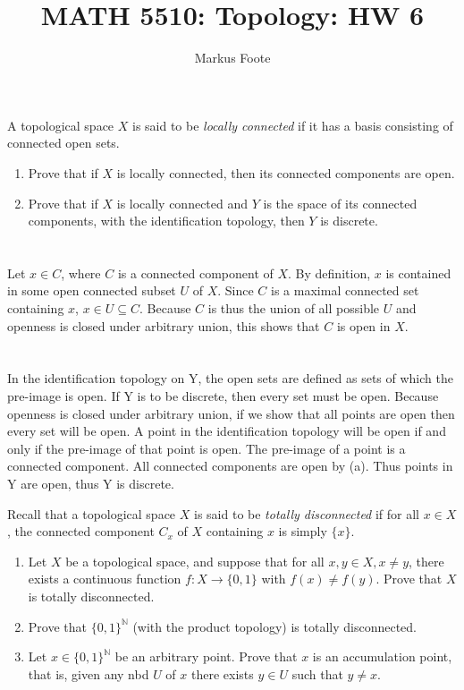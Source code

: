 \documentclass{jhwhw}
\title{MATH 5510: Topology: HW 6}
\author{Markus Foote}
\newcommand{\N}{{\mathbb N}}
\begin{document}
\problem{}%
A topological space $X$ is said to be \emph{locally connected} if it has a basis consisting of connected open sets.
\begin{enumerate}
	\item Prove that if $X$ is locally connected, then its connected components are open.
	\item Prove that if $X$ is locally connected and $Y$ is the space of its connected components, with the identification topology, then $Y$ is discrete.
\end{enumerate}
\solution{}
\part{}%
Let $x\in C$, where $C$ is a connected component of $X$. By definition, $x$ is contained in some open connected subset $U$ of $X$. Since $C$ is a maximal connected set containing $x$, $x\in U\subseteq C$. Because $C$ is thus the union of all possible $U$ and openness is closed under arbitrary union, this shows that $C$ is open in $X$.
\part{}%
In the identification topology on Y, the open sets are defined as sets of which the pre-image is open. If Y is to be discrete, then every set must be open. Because openness is closed under arbitrary union, if we show that all points are open then every set will be open. A point in the identification topology will be open if and only if the pre-image of that point is open. The pre-image of a point is a connected component. All connected components are open by (a). Thus points in Y are open, thus Y is discrete.

\problem{} %
Recall that a topological space $X$ is said to be \emph{totally disconnected} if for all $x\in X$, the connected component $C_x$ of $X$ containing $x$ is simply $\{x\}$.  %
\begin{enumerate}
	
	\item Let $X$ be a topological space, and suppose that for all $x,y \in X, x\ne y$, there exists a continuous  function $f:X\to \{0,1\}$ with $f(x)\ne f(y)$. Prove that $X$ is totally disconnected.
	
	
	\item Prove that $\{0,1\}^\N$ (with the product topology) is totally disconnected.
	
	\item Let $ x \in \{0,1\}^\N$ be an arbitrary point.  Prove that $x$ is an accumulation point, that is, given any nbd $U $ of $x$ there exists $y\in U$ such that $y\ne x$.  
\end{enumerate}
\solution{}
\end{document}

